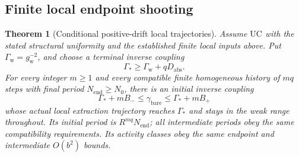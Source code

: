\documentclass[11pt]{article}
\newtheorem{theorem}{Theorem}[section]
\theoremstyle{remark}
\begin{document}
\subsection{Finite local endpoint shooting}
\label{lpd-shooting}

\begin{theorem}[Conditional positive-drift local trajectories]
\label{lpd-main}
Assume \(\mathrm{UC}\) with the stated structural uniformity and
the established finite local inputs above. Put
\(\Gamma_{\mathrm w}=g_{\mathrm w}^{-2}\), and choose a terminal
inverse coupling
\begin{equation}
                 \Gamma_*\ge
                    \Gamma_{\mathrm w}+qD_{\mathrm{abs}}.
 \label{lpd-terminal}
\end{equation}
For every integer \(m\ge1\) and every compatible finite homogeneous
history of \(mq\) steps with final period \(N_{\mathrm{end}}\ge N_0\),
there is an initial inverse coupling
\begin{equation}
 \Gamma_*+mB_-\le\gamma_{\mathrm{bare}}
                      \le\Gamma_*+mB_+
 \label{lpd-initial-interval}
\end{equation}
whose actual local extraction trajectory reaches \(\Gamma_*\)
and stays in the weak range throughout. Its initial period is
\(R^{mq}N_{\mathrm{end}}\); all intermediate periods obey the
same compatibility requirements. Its activity classes obey the
same endpoint and intermediate \(O(b^2)\) bounds.
\end{theorem}
\end{document}
